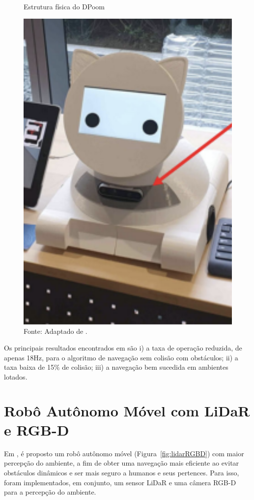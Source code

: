 \begin{figure}[h]
    \centering
    \caption{Estrutura física do DPoom}
    \includegraphics[scale=0.6]{dpoom.png}
    \caption*{Fonte: Adaptado de \citet{dpoom}.}
    \label{fig:dpoom}
\end{figure}

Os principais resultados encontrados em \citet{dpoom} são i) a taxa de operação reduzida,  de apenas 18Hz, para o algoritmo de navegação sem colisão com obstáculos; ii) a taxa baixa de 15\% de colisão; iii) a navegação bem sucedida em ambientes lotados.

\section{Robô Autônomo Móvel com LiDaR e RGB-D}
Em \citet{lidarRGBD},  é proposto um robô autônomo móvel (Figura~\ref{fig:lidarRGBD}) com maior percepção do ambiente, a fim de obter uma navegação mais eficiente ao evitar obstáculos dinâmicos e ser mais seguro a humanos e seus pertences. Para isso, foram implementados, em conjunto, um sensor LiDaR e uma câmera RGB-D para a percepção do ambiente. 


